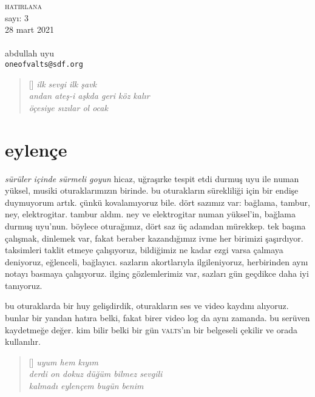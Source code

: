 \documentclass[a4paper, twocolumn, openright]{memoir}
\begin{document}
\thispagestyle{plain}
\noindent
{\HUGE\textsc{hatirlana}\\\small{}sayı: 3\\28 mart 2021}\\\\
{abdullah uyu\\\texttt{oneofvalts@sdf.org}}
\bigskip
{}
\begin{verse}[\versewidth]
  \itshape{}
  ilk sevgi ilk şavk\\
  andan ateş-i aşkda geri köz kalır\\
  öçesiye sızılar ol ocak
\end{verse}
\section{eylençe}
\textit{sürüler içinde sürmeli goyun} hicaz, uğraşırke tespit etdi durmuş
uyu ile numan yüksel, musiki oturaklarımızın birinde. bu oturakların
sürekliliği için bir endişe duymuyorum artık. çünkü kovalamıyoruz bile.
dört sazımız var: bağlama, tambur, ney, elektrogitar. tambur aldım. ney
ve elektrogitar numan yüksel'in, bağlama durmuş uyu'nun. böylece
oturağımız, dört saz üç adamdan mürekkep. tek başına çalışmak, dinlemek
var, fakat beraber kazandığımız ivme her birimizi şaşırdıyor. taksimleri
taklit etmeye çalışıyoruz, bildiğimiz ne kadar ezgi varsa çalmaya
deniyoruz, eğlenceli, bağlayıcı. sazların akortlarıyla ilgileniyoruz,
herbirinden aynı notayı basmaya çalışıyoruz. ilginç gözlemlerimiz var,
sazları gün geçdikce daha iyi tanıyoruz.

bu oturaklarda bir huy gelişdirdik, oturakların ses ve video
kaydını alıyoruz. bunlar bir yandan hatıra belki, fakat birer video log da
aynı zamanda. bu serüven kaydetmeğe değer. kim bilir belki bir gün
\textsc{valts}'ın bir belgeseli çekilir ve orada kullanılır.
\begin{verse}[\versewidth]
  \itshape{}
  uyum hem kıyım\\
  derdi on dokuz düğüm bilmez sevgili\\
  kalmadı eylençem bugün benim
\end{verse}
\end{document}
